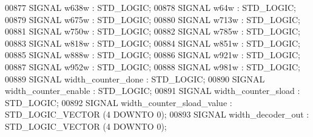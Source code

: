 \begin{DoxyCode}
{00877      \textcolor{keywordflow}{SIGNAL}  \textcolor{vhdlchar}{w638w} \textcolor{vhdlchar}{:}    \textcolor{comment}{STD\_LOGIC};
00878      \textcolor{keywordflow}{SIGNAL}  \textcolor{vhdlchar}{w64w} \textcolor{vhdlchar}{:} \textcolor{comment}{STD\_LOGIC};
00879      \textcolor{keywordflow}{SIGNAL}  \textcolor{vhdlchar}{w675w} \textcolor{vhdlchar}{:}    \textcolor{comment}{STD\_LOGIC};
00880      \textcolor{keywordflow}{SIGNAL}  \textcolor{vhdlchar}{w713w} \textcolor{vhdlchar}{:}    \textcolor{comment}{STD\_LOGIC};
00881      \textcolor{keywordflow}{SIGNAL}  \textcolor{vhdlchar}{w750w} \textcolor{vhdlchar}{:}    \textcolor{comment}{STD\_LOGIC};
00882      \textcolor{keywordflow}{SIGNAL}  \textcolor{vhdlchar}{w785w} \textcolor{vhdlchar}{:}    \textcolor{comment}{STD\_LOGIC};
00883      \textcolor{keywordflow}{SIGNAL}  \textcolor{vhdlchar}{w818w} \textcolor{vhdlchar}{:}    \textcolor{comment}{STD\_LOGIC};
00884      \textcolor{keywordflow}{SIGNAL}  \textcolor{vhdlchar}{w851w} \textcolor{vhdlchar}{:}    \textcolor{comment}{STD\_LOGIC};
00885      \textcolor{keywordflow}{SIGNAL}  \textcolor{vhdlchar}{w888w} \textcolor{vhdlchar}{:}    \textcolor{comment}{STD\_LOGIC};
00886      \textcolor{keywordflow}{SIGNAL}  \textcolor{vhdlchar}{w921w} \textcolor{vhdlchar}{:}    \textcolor{comment}{STD\_LOGIC};
00887      \textcolor{keywordflow}{SIGNAL}  \textcolor{vhdlchar}{w952w} \textcolor{vhdlchar}{:}    \textcolor{comment}{STD\_LOGIC};
00888      \textcolor{keywordflow}{SIGNAL}  \textcolor{vhdlchar}{w981w} \textcolor{vhdlchar}{:}    \textcolor{comment}{STD\_LOGIC};
00889      \textcolor{keywordflow}{SIGNAL}  \textcolor{vhdlchar}{width_counter_done} \textcolor{vhdlchar}{:}   \textcolor{comment}{STD\_LOGIC};
00890      \textcolor{keywordflow}{SIGNAL}  \textcolor{vhdlchar}{width_counter_enable} \textcolor{vhdlchar}{:} \textcolor{comment}{STD\_LOGIC};
00891      \textcolor{keywordflow}{SIGNAL}  \textcolor{vhdlchar}{width_counter_sload} \textcolor{vhdlchar}{:}  \textcolor{comment}{STD\_LOGIC};
00892      \textcolor{keywordflow}{SIGNAL}  \textcolor{vhdlchar}{width_counter_sload_value} \textcolor{vhdlchar}{:}    \textcolor{comment}{STD\_LOGIC\_VECTOR} \textcolor{vhdlchar}{(}\textcolor{vhdllogic}{}\textcolor{vhdllogic}{4} \textcolor{keywordflow}{DOWNTO} \textcolor{vhdllogic}{}\textcolor{vhdllogic}{0}\textcolor{vhdlchar}{)};
00893      \textcolor{keywordflow}{SIGNAL}  \textcolor{vhdlchar}{width_decoder_out} \textcolor{vhdlchar}{:}    \textcolor{comment}{STD\_LOGIC\_VECTOR} \textcolor{vhdlchar}{(}\textcolor{vhdllogic}{}\textcolor{vhdllogic}{4} \textcolor{keywordflow}{DOWNTO} \textcolor{vhdllogic}{}\textcolor{vhdllogic}{0}\textcolor{vhdlchar}{)};
}
\end{DoxyCode}
